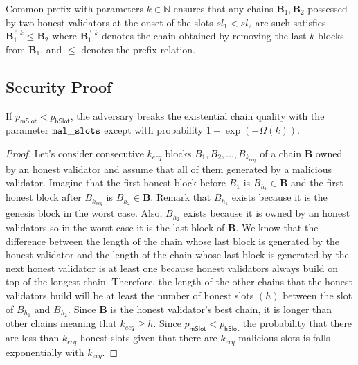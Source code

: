\begin{definition} \label{def:cp}
	Common prefix with parameters $k \in \mathbb{N}$ ensures that any chains $\mathbf{B}_1, \mathbf{B}_2$ possessed by two honest validators at the onset of the slots $sl_1 < sl_2$ are such satisfies $\mathbf{B}_1^{\ulcorner k} \leq \mathbf{B}_2$ where  $\mathbf{B}_1^{\ulcorner k}$ denotes the chain obtained by removing the last $k$ blocks from $\mathbf{B}_1$, and $\leq$ denotes the prefix relation.
\end{definition}

\subsection{Security Proof}

\begin{lemma}[ECQ]
	If $ p_{\mathsf{mSlot}} < p_{\mathsf{hSlot}} $, the adversary breaks the existential chain quality with the parameter $ \mathtt{mal\_slots} $ except with probability $ 1- \exp(-\Omega(k)) $.
\end{lemma}

\begin{proof}
	
	Let's consider consecutive $ k_{ecq} $ blocks $ B_1, B_2, ..., B_{k_{ecq}} $ of a chain $ \mathbf{B} $ owned by an honest validator  and assume that all of them generated by a malicious validator. Imagine that the first honest block before $ B_1 $ is $ B_{h_1}  \in \mathbf{B}$  and the first honest block after $ B_{k_{ecq}} $ is $ B_{h_2}  \in \mathbf{B}$. Remark that $ B_{h_1} $ exists because it is the genesis block in the worst case. Also, $ B_{h_2} $ exists because it is owned by an honest validators so in the worst case it is the last block of $ \mathbf{B} $. We know that the difference between the length of the chain whose last block is generated by the honest validator and the length of the chain whose last block is generated by the next honest validator is at least one because honest validators always build on top of the longest chain. Therefore, the length of the other chains that the honest validators build will be at least the number of honest slots $ (h) $ between the slot of $ B_{h_1} $ and $ B_{h_2} $. Since $ \mathbf{B} $ is the honest validator's best chain, it is longer than other chains meaning that $ k_{ecq} \geq h $.  Since $ p_{\mathsf{mSlot}} < p_{\mathsf{hSlot}} $ the probability that there are less than $ k_{ecq} $ honest slots given that there are $ k_{ecq} $ malicious slots is  falls exponentially with $ k_{ecq} $.
\end{proof}


